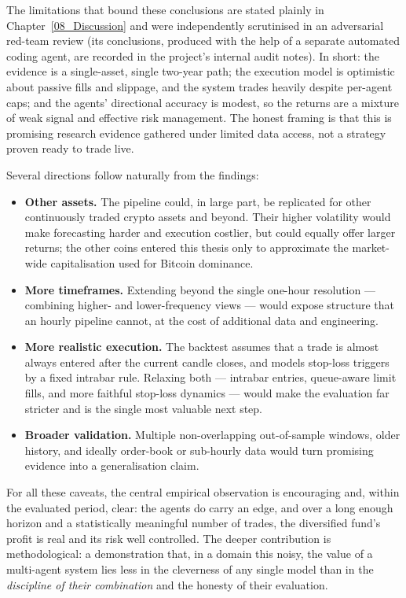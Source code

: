 The limitations that bound these conclusions are stated plainly in Chapter~\ref{08_Discussion} and were independently scrutinised in an adversarial red-team review (its conclusions, produced with the help of a separate automated coding agent, are recorded in the project's internal audit notes). In short: the evidence is a single-asset, single two-year path; the execution model is optimistic about passive fills and slippage, and the system trades heavily despite per-agent caps; and the agents' directional accuracy is modest, so the returns are a mixture of weak signal and effective risk management. The honest framing is that this is promising research evidence gathered under limited data access, not a strategy proven ready to trade live.


Several directions follow naturally from the findings:


\begin{itemize}
    \item \textbf{Other assets.} The pipeline could, in large part, be replicated for other continuously traded crypto assets and beyond. Their higher volatility would make forecasting harder and execution costlier, but could equally offer larger returns; the other coins entered this thesis only to approximate the market-wide capitalisation used for Bitcoin dominance.
    \item \textbf{More timeframes.} Extending beyond the single one-hour resolution --- combining higher- and lower-frequency views --- would expose structure that an hourly pipeline cannot, at the cost of additional data and engineering.
    \item \textbf{More realistic execution.} The backtest assumes that a trade is almost always entered after the current candle closes, and models stop-loss triggers by a fixed intrabar rule. Relaxing both --- intrabar entries, queue-aware limit fills, and more faithful stop-loss dynamics --- would make the evaluation far stricter and is the single most valuable next step.
    \item \textbf{Broader validation.} Multiple non-overlapping out-of-sample windows, older history, and ideally order-book or sub-hourly data would turn promising evidence into a generalisation claim.
\end{itemize}


For all these caveats, the central empirical observation is encouraging and, within the evaluated period, clear: the agents do carry an edge, and over a long enough horizon and a statistically meaningful number of trades, the diversified fund's profit is real and its risk well controlled. The deeper contribution is methodological: a demonstration that, in a domain this noisy, the value of a multi-agent system lies less in the cleverness of any single model than in the \textit{discipline of their combination} and the honesty of their evaluation.


